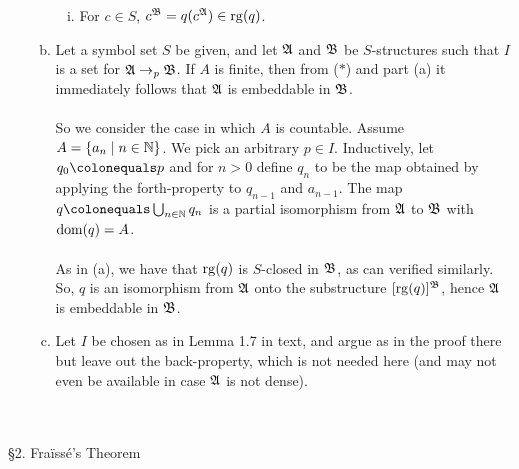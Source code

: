 \begin{enumerate}[1.]
\begin{enumerate}[(a)]
\begin{enumerate}[(i)]
\item For $c \in S$, $c^{\mathfrak{B}} = q(c^{\mathfrak{A}}) \in {\mathrm{rg}(q)}$.
\end{enumerate}
\item Let a symbol set $S$ be given, and let $\mathfrak{A}$ and $\mathfrak{B}$ be $S$-structures such that $I$ is a set for $\mathfrak{A} \mathrel{\rightarrow_\mathit{p}} \mathfrak{B}$. If $A$ is finite, then from ($\ast$) and part (a) it immediately follows that $\mathfrak{A}$ is embeddable in $\mathfrak{B}$.\\
\ \\
So we consider the case in which $A$ is countable. Assume $A = \{ a_n \mid n \in \mathbb{N} \}$. We pick an arbitrary $p \in I$. Inductively, let $q_0 \colonequals p$ and for $n > 0$ define $q_n$ to be the map obtained by applying the forth-property to $q_{n - 1}$ and $a_{n - 1}$. The map $q \colonequals \bigcup_{n \in \nat} q_n$ is a partial isomorphism from $\mathfrak{A}$ to $\mathfrak{B}$ with ${\mathrm{dom}(q)} = A$.\\
\ \\
As in (a), we have that ${\mathrm{rg}(q)}$ is $S$-closed in $\mathfrak{B}$, as can verified similarly. So, $q$ is an isomorphism from $\mathfrak{A}$ onto the substructure $[{\mathrm{rg}(q)}]^{\mathfrak{B}}$, hence $\mathfrak{A}$ is embeddable in $\mathfrak{B}$.
\item Let $I$ be chosen as in Lemma 1.7 in text, and argue as in the proof there but leave out the back-property, which is not needed here (and may not even be available in case $\mathfrak{A}$ is not dense).
\end{enumerate}
\end{enumerate}
\
\\
\\
{\large \S2. Fra\"{i}ss\'{e}'s Theorem}
